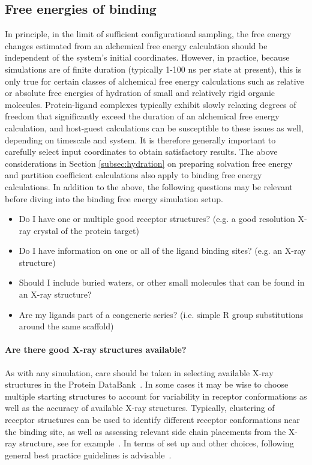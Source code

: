 \documentclass[9pt,bestpractices]{livecoms}
\begin{document}
\subsection{Free energies of binding}
\label{subsec:binding}
In principle, in the limit of sufficient configurational sampling, the free energy changes estimated from an alchemical free energy calculation should be independent of the system's initial coordinates. However, in practice, because simulations are of finite duration (typically 1-100 ns per state at present), this is only true for certain classes of alchemical free energy calculations such as relative or absolute free energies of hydration of small and relatively rigid organic molecules. Protein-ligand complexes typically exhibit slowly relaxing degrees of freedom that significantly exceed the duration of an alchemical free energy calculation, and host-guest calculations can be susceptible to these issues as well, depending on timescale and system. It is therefore generally important to carefully select input coordinates to obtain satisfactory results. The above considerations in Section \ref{subsec:hydration} on preparing solvation free energy and partition coefficient calculations also apply to binding free energy calculations. 
In addition to the above, the following questions may be relevant before diving into the binding free energy simulation setup.

\begin{itemize}
    \item Do I have one or multiple good receptor structures? (e.g. a good resolution X-ray crystal of the protein target)
    \item Do I have information on one or all of the ligand binding sites? (e.g. an X-ray structure)
    \item Should I include buried waters, or other small molecules that can be found in an X-ray structure?
    \item Are my ligands part of a congeneric series? (i.e. simple R group substitutions around the same scaffold)
    \end{itemize}

\paragraph{Are there good X-ray structures available?}
As with any simulation, care should be taken in selecting available X-ray structures in the Protein DataBank~\cite{berman2003announcing}. In some cases it may be wise to choose multiple starting structures to account for variability in receptor conformations as well as the accuracy of available X-ray structures. Typically, clustering of receptor structures can be used to identify different receptor conformations near the binding site, as well as assessing relevant side chain placements from the X-ray structure, see for example~\cite{mey2016blinded}. In terms of set up and other choices, following general best practice guidelines is advisable~\cite{braun2019best}.
\end{document}
